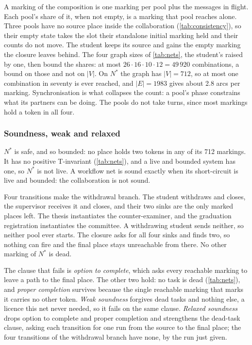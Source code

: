 A marking of the composition is one marking per pool plus the messages in flight. Each pool's share of it, when not empty, is a marking that pool reaches alone. Three pools have no source place inside the collaboration (\cref{tab:consistency}), so their empty state takes the slot their standalone initial marking held and their counts do not move. The student keeps its source and gains the empty marking the closure leaves behind. The four graph sizes of \cref{tab:nets}, the student's raised by one, then bound the shares: at most $26 \cdot 16 \cdot 10 \cdot 12 = 49\,920$ combinations, a bound on those and not on $|V|$. On $N^*$ the graph has $|V| = 712$, so at most one combination in seventy is ever reached, and $|E| = 1983$ gives about 2.8 arcs per marking. Synchronisation is what collapses the count: a pool's phase constrains what its partners can be doing. The pools do not take turns, since most markings hold a token in all four.

\subsubsection{Soundness, weak and relaxed}
\label{sec:global:sound}

$N^*$ is safe, and so bounded: no place holds two tokens in any of its 712 markings. It has no positive T-invariant (\cref{tab:nets}), and a live and bounded system has one, so $N^*$ is not live. A workflow net is sound exactly when its short-circuit is live and bounded: the collaboration is not sound.

Four transitions make the withdrawal branch. The student withdraws and closes, the supervisor receives it and closes, and their two sinks are the only marked places left. The thesis instantiates the counter-examiner, and the graduation registration instantiates the committee. A withdrawing student sends neither, so neither pool ever starts. The closure asks for all four sinks and finds two, so nothing can fire and the final place stays unreachable from there. No other marking of $N^*$ is dead.

The clause that fails is \emph{option to complete}, which asks every reachable marking to leave a path to the final place. The other two hold: no task is dead (\cref{tab:nets}), and \emph{proper completion} survives because the single reachable marking that marks it carries no other token. \emph{Weak soundness} forgives dead tasks and nothing else, a licence this net never needed, so it fails on the same clause. \emph{Relaxed soundness} drops option to complete and proper completion and strengthens the dead-task clause, asking each transition for one run from the source to the final place; the four transitions of the withdrawal branch have none, by the run just given.

